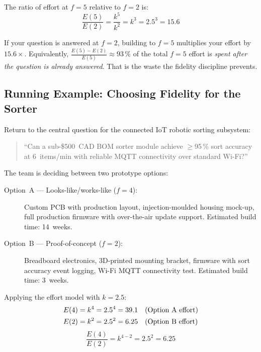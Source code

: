 The ratio of effort at $f=5$ relative to $f=2$ is:
\begin{equation}
  \label{eq:ch3-effort-ratio}
  \frac{E(5)}{E(2)} = \frac{k^5}{k^2} = k^3 = 2.5^3 = 15.6
\end{equation}

If your question is answered at $f=2$, building to $f=5$ multiplies your
effort by $15.6\times$.
Equivalently, $\frac{E(5) - E(2)}{E(5)} \approx 93\,\%$ of the total
$f=5$ effort is \emph{spent after the question is already answered}.
That is the waste the fidelity discipline prevents.

\subsection{Running Example: Choosing Fidelity for the Sorter}
\label{sec:ch3-sorter-fidelity}

Return to the central question for the connected IoT robotic sorting
subsystem:

\begin{quote}
  ``Can a sub-\$500~CAD BOM sorter module achieve $\geq$95\,\% sort accuracy
  at 6~items/min with reliable MQTT connectivity over standard Wi-Fi?''
\end{quote}

The team is deciding between two prototype options:

\begin{description}
  \item[Option~A --- Looks-like/works-like ($f=4$):]
    Custom PCB with production layout, injection-moulded housing mock-up,
    full production firmware with over-the-air update support.
    Estimated build time: 14~weeks.

  \item[Option~B --- Proof-of-concept ($f=2$):]
    Breadboard electronics, 3D-printed mounting bracket, firmware with sort
    accuracy event logging, Wi-Fi MQTT connectivity test.
    Estimated build time: 3~weeks.
\end{description}

Applying the effort model with $k=2.5$:
\begin{align}
  E(4) &= k^4 = 2.5^4 = 39.1 \quad \text{(Option A effort)} \notag \\
  E(2) &= k^2 = 2.5^2 = 6.25 \quad \text{(Option B effort)} \notag
\end{align}
\begin{equation}
  \label{eq:ch3-sorter-ratio}
  \frac{E(4)}{E(2)} = k^{4-2} = 2.5^2 = 6.25
\end{equation}

